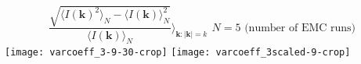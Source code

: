 {\begin{minipage}[t]{.95\colwidth}
\begin{minipage}[][][t]{\textwidth}
{\begin{minipage}[ ]{\textwidth}
\begin{center}
{\begin{equation*}
                  \frac{
                    \sqrt{
                      \langle I(\mathbf{k})^{2}\rangle_N - \langle I(\mathbf{k})\rangle_N^{2}
                    }
                  }{
                    \langle I(\mathbf{k})\rangle_N
                  }
                  \Bigg\rangle_{\mathbf{k}: |\mathbf{k}| = k}\,\ N=5
                  \text{\ (number of EMC runs)}
                  \label{eqn:coeff_variation}
                \end{equation*}
              }
              \hspace*{.05\textwidth}
              \texttt{[image: varcoeff\_3-9-30-crop]}%
              \hfill
              \texttt{[image: varcoeff\_3scaled-9-crop]}%
              \hspace*{.05\textwidth}
            \end{center}
          \end{minipage}\\[1ex]
        }
      \end{minipage}
    \end{minipage}
  }


